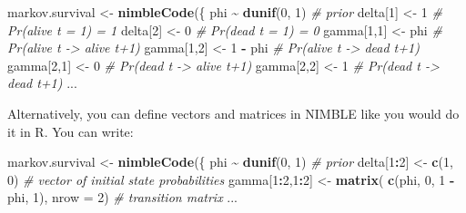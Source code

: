 \documentclass[
  12pt,
]{krantz}
\newenvironment{Shaded}{\begin{snugshade}}{\end{snugshade}}
\newcommand{\AttributeTok}[1]{\textcolor[rgb]{0.13,0.29,0.53}{#1}}
\newcommand{\CommentTok}[1]{\textcolor[rgb]{0.56,0.35,0.01}{\textit{#1}}}
\newcommand{\DecValTok}[1]{\textcolor[rgb]{0.00,0.00,0.81}{#1}}
\newcommand{\FunctionTok}[1]{\textcolor[rgb]{0.13,0.29,0.53}{\textbf{#1}}}
\newcommand{\NormalTok}[1]{#1}
\newcommand{\OtherTok}[1]{\textcolor[rgb]{0.56,0.35,0.01}{#1}}
\newcommand{\SpecialCharTok}[1]{\textcolor[rgb]{0.81,0.36,0.00}{\textbf{#1}}}
\begin{document}
\begin{Shaded}
\begin{Highlighting}[]
\NormalTok{markov.survival }\OtherTok{\textless{}{-}} \FunctionTok{nimbleCode}\NormalTok{(\{}
\NormalTok{  phi }\SpecialCharTok{\textasciitilde{}} \FunctionTok{dunif}\NormalTok{(}\DecValTok{0}\NormalTok{, }\DecValTok{1}\NormalTok{) }\CommentTok{\# prior}
\NormalTok{  delta[}\DecValTok{1}\NormalTok{] }\OtherTok{\textless{}{-}} \DecValTok{1}          \CommentTok{\# Pr(alive t = 1) = 1}
\NormalTok{  delta[}\DecValTok{2}\NormalTok{] }\OtherTok{\textless{}{-}} \DecValTok{0}          \CommentTok{\# Pr(dead t = 1) = 0}
\NormalTok{  gamma[}\DecValTok{1}\NormalTok{,}\DecValTok{1}\NormalTok{] }\OtherTok{\textless{}{-}}\NormalTok{ phi      }\CommentTok{\# Pr(alive t {-}\textgreater{} alive t+1)}
\NormalTok{  gamma[}\DecValTok{1}\NormalTok{,}\DecValTok{2}\NormalTok{] }\OtherTok{\textless{}{-}} \DecValTok{1} \SpecialCharTok{{-}}\NormalTok{ phi  }\CommentTok{\# Pr(alive t {-}\textgreater{} dead t+1)}
\NormalTok{  gamma[}\DecValTok{2}\NormalTok{,}\DecValTok{1}\NormalTok{] }\OtherTok{\textless{}{-}} \DecValTok{0}        \CommentTok{\# Pr(dead t {-}\textgreater{} alive t+1)}
\NormalTok{  gamma[}\DecValTok{2}\NormalTok{,}\DecValTok{2}\NormalTok{] }\OtherTok{\textless{}{-}} \DecValTok{1}        \CommentTok{\# Pr(dead t {-}\textgreater{} dead t+1)}
\NormalTok{...}
\end{Highlighting}
\end{Shaded}

Alternatively, you can define vectors and matrices in NIMBLE like you would do it in R. You can write:

\begin{Shaded}
\begin{Highlighting}[]
\NormalTok{markov.survival }\OtherTok{\textless{}{-}} \FunctionTok{nimbleCode}\NormalTok{(\{}
\NormalTok{  phi }\SpecialCharTok{\textasciitilde{}} \FunctionTok{dunif}\NormalTok{(}\DecValTok{0}\NormalTok{, }\DecValTok{1}\NormalTok{) }\CommentTok{\# prior}
\NormalTok{  delta[}\DecValTok{1}\SpecialCharTok{:}\DecValTok{2}\NormalTok{] }\OtherTok{\textless{}{-}} \FunctionTok{c}\NormalTok{(}\DecValTok{1}\NormalTok{, }\DecValTok{0}\NormalTok{) }\CommentTok{\# vector of initial state probabilities}
\NormalTok{  gamma[}\DecValTok{1}\SpecialCharTok{:}\DecValTok{2}\NormalTok{,}\DecValTok{1}\SpecialCharTok{:}\DecValTok{2}\NormalTok{] }\OtherTok{\textless{}{-}} \FunctionTok{matrix}\NormalTok{( }\FunctionTok{c}\NormalTok{(phi, }\DecValTok{0}\NormalTok{, }\DecValTok{1} \SpecialCharTok{{-}}\NormalTok{ phi, }\DecValTok{1}\NormalTok{), }\AttributeTok{nrow =} \DecValTok{2}\NormalTok{) }\CommentTok{\# transition matrix}
\NormalTok{...}
\end{Highlighting}
\end{Shaded}
\end{document}
